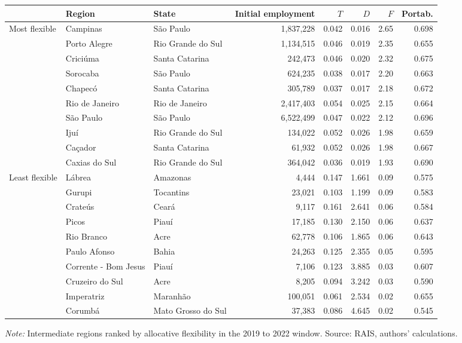 {\footnotesize
\setlength{\tabcolsep}{3.5pt}
\begin{threeparttable}
\begin{tabular}{lllrrrrr}
\toprule
 & Region & State & Initial employment & $T$ & $D$ & $F$ & Portab. \\
\midrule
Most flexible & Campinas & São Paulo & 1,837,228 & 0.042 & 0.016 & 2.65 & 0.698 \\
 & Porto Alegre & Rio Grande do Sul & 1,134,515 & 0.046 & 0.019 & 2.35 & 0.655 \\
 & Criciúma & Santa Catarina & 242,473 & 0.046 & 0.020 & 2.32 & 0.675 \\
 & Sorocaba & São Paulo & 624,235 & 0.038 & 0.017 & 2.20 & 0.663 \\
 & Chapecó & Santa Catarina & 305,789 & 0.037 & 0.017 & 2.18 & 0.672 \\
 & Rio de Janeiro & Rio de Janeiro & 2,417,403 & 0.054 & 0.025 & 2.15 & 0.664 \\
 & São Paulo & São Paulo & 6,522,499 & 0.047 & 0.022 & 2.12 & 0.696 \\
 & Ijuí & Rio Grande do Sul & 134,022 & 0.052 & 0.026 & 1.98 & 0.659 \\
 & Caçador & Santa Catarina & 61,932 & 0.052 & 0.026 & 1.98 & 0.667 \\
 & Caxias do Sul & Rio Grande do Sul & 364,042 & 0.036 & 0.019 & 1.93 & 0.690 \\
\addlinespace[3pt]
Least flexible & Lábrea & Amazonas & 4,444 & 0.147 & 1.661 & 0.09 & 0.575 \\
 & Gurupi & Tocantins & 23,021 & 0.103 & 1.199 & 0.09 & 0.583 \\
 & Crateús & Ceará & 9,117 & 0.161 & 2.641 & 0.06 & 0.584 \\
 & Picos & Piauí & 17,185 & 0.130 & 2.150 & 0.06 & 0.637 \\
 & Rio Branco & Acre & 62,778 & 0.106 & 1.865 & 0.06 & 0.643 \\
 & Paulo Afonso & Bahia & 24,263 & 0.125 & 2.355 & 0.05 & 0.595 \\
 & Corrente - Bom Jesus & Piauí & 7,106 & 0.123 & 3.885 & 0.03 & 0.607 \\
 & Cruzeiro do Sul & Acre & 8,205 & 0.094 & 3.242 & 0.03 & 0.590 \\
 & Imperatriz & Maranhão & 100,051 & 0.061 & 2.534 & 0.02 & 0.655 \\
 & Corumbá & Mato Grosso do Sul & 37,383 & 0.086 & 4.645 & 0.02 & 0.545 \\
\bottomrule
\end{tabular}
\begin{tablenotes}[flushleft]\footnotesize
\item \textit{Note:} Intermediate regions ranked by allocative flexibility in the 2019 to 2022 window. Source: RAIS, authors' calculations.
\end{tablenotes}
\end{threeparttable}
}
